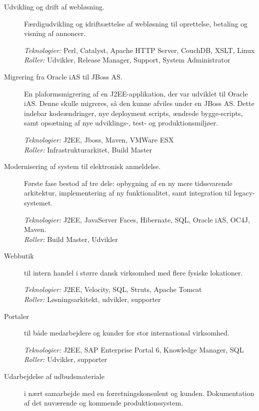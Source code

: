 \documentclass[a4paper,11pt]{article}
\begin{document}
\begin{description}

\item[Udvikling og drift af webløsning.] Færdigudvikling og
  idriftsættelse af webløsning til oprettelse,
  betaling og visning af annoncer.

  \textit{Teknologier:} Perl, Catalyst, Apache HTTP Server, CouchDB, XSLT, Linux\\
  \textit{Roller:} Udvikler, Release Manager, Support, System Administrator

\item[Migrering fra Oracle iAS til JBoss AS.] En
  plaformsmigrering af en J2EE-applikation, der var udviklet til
  Oracle iAS. Denne skulle migreres, så den kunne afviles under
  en JBoss AS. Dette indebar kodeændringer, nye deployment
  scripts, ændrede bygge-scripts, samt opsætning af nye
  udviklings-, test- og produktionsmiljøer.

  \textit{Teknologier:} J2EE, Jboss, Maven, VMWare ESX\\
  \textit{Roller:} Infrastrukturarkitet, Build Master

\item[Modernisering af system til elektronisk anmeldelse.]
  Første fase bestod af tre dele: opbygning af en ny mere
  tidssvarende arkitektur, implementering af ny
  funktionalitet, samt integration til legacy-systemet.

  \textit{Teknologier:} J2EE, JavaServer Faces, Hibernate, SQL, Oracle
  iAS, OC4J, Maven.\\
  \textit{Roller:} Build Master, Udvikler

\item[Webbutik] til intern handel i større dansk virksomhed
  med flere fysiske lokationer.

  \textit{Teknologier:} J2EE, Velocity, SQL, Struts, Apache Tomcat\\
  \textit{Roller:} Løsningsarkitekt, udvikler, supporter

\item[Portaler] til både medarbejdere og kunder for stor
  international virksomhed.

  \textit{Teknologier:} J2EE, SAP Enterprise Portal 6, Knowledge Manager, SQL\\
  \textit{Roller:} Udvikler, supporter

\item[Udarbejdelse af udbudsmateriale] i nært samarbejde med en
  forretningskonsulent og kunden. Dokumentation af det nuværende og
  kommende produktionssystem.


\end{description}
\end{document}

